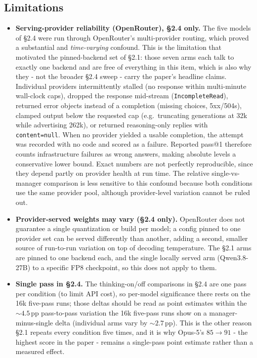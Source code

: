 \documentclass[11pt]{article}
\begin{document}
\subsection{Limitations}

\begin{itemize}
  \item \textbf{Serving-provider reliability (OpenRouter), \S2.4 only.} The five models of
  \S2.4 were run through OpenRouter's multi-provider routing, which proved a
  substantial and \textit{time-varying} confound. This is the limitation that motivated the
  pinned-backend set of \S2.1: those seven arms each talk to exactly one backend and are free
  of everything in this item, which is also why they - not the broader \S2.4 sweep - carry
  the paper's headline claims. Individual providers intermittently
  stalled (no response within multi-minute wall-clock caps), dropped the response
  mid-stream (\texttt{IncompleteRead}), returned error objects instead of a completion
  (missing choices, 5xx/504s), clamped output below the requested cap (e.g.\
  truncating generations at 32k while advertising 262k), or returned
  reasoning-only replies with \texttt{content=null}. When no provider yielded a
  usable completion, the attempt was recorded with no code and scored as a failure.
  Reported pass@1 therefore counts infrastructure failures as wrong answers, making
  absolute levels a conservative lower bound. Exact numbers are not perfectly
  reproducible, since they depend partly on provider health at run time. The relative
  single-vs-manager comparison is less sensitive to this confound because both conditions 
  use the same provider pool, although provider-level variation cannot be ruled out.

  \item \textbf{Provider-served weights may vary (\S2.4 only).} OpenRouter does not
  guarantee a single quantization or build per model; a config pinned to one provider set
  can be served differently than another, adding a second, smaller source of run-to-run
  variation on top of decoding temperature. The \S2.1 arms are pinned to one backend each,
  and the single locally served arm (Qwen3.8-27B) to a specific FP8 checkpoint, so this
  does not apply to them.

  \item \textbf{Single pass in \S2.4.} The thinking-on/off comparisons in \S2.4 are one
  pass per condition (to limit API cost), so per-model significance there rests on the 16k
  five-pass runs; those deltas should be read as point estimates within the
  ${\sim}4.5$\,pp pass-to-pass variation the 16k five-pass runs show on a
  manager-minus-single delta (individual arms vary by ${\sim}2.7$\,pp). This is the other
  reason \S2.1 repeats every condition five times, and it is why Opus-5's $85 \to 91$ -
  the highest score in the paper - remains a single-pass point estimate rather than a
  measured effect.


\end{itemize}
\end{document}

